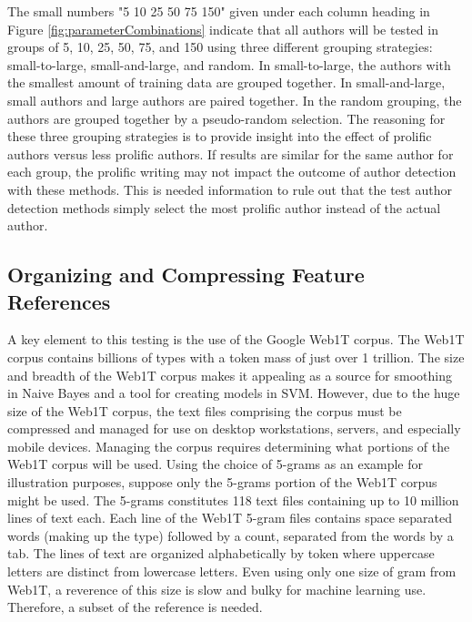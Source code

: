 The small numbers "5 10 25 50 75 150" given under each column heading in Figure \ref{fig:parameterCombinations} indicate that all authors will be tested in groups of 5, 10, 25, 50, 75, and 150 using three different grouping strategies: small-to-large, small-and-large, and random. In small-to-large, the authors with the smallest amount of training data are grouped together.  In small-and-large, small authors and large authors are paired together.  In the random grouping, the authors are grouped together by a pseudo-random selection.  The reasoning for these three grouping strategies is to provide insight into the effect of prolific authors versus less prolific authors.  If results are similar for the same author for each group, the prolific writing may not impact the outcome of author detection with these methods.  This is needed information to rule out that the test author detection methods simply select the most prolific author instead of the actual author.

	\subsection{Organizing and Compressing Feature References} A key element to this testing is the use of the Google Web1T corpus.  The Web1T corpus contains billions of types with a token mass of just over 1 trillion.  The size and breadth of the Web1T corpus makes it appealing as a source for smoothing in Naive Bayes and a tool for creating models in SVM. However, due to the huge size of the Web1T corpus, the text files comprising the corpus must be compressed and managed for use on desktop workstations, servers, and especially mobile devices.  Managing the corpus requires determining what portions of the Web1T corpus will be used.  Using the choice of 5-grams as an example for illustration purposes, suppose only the 5-grams portion of the Web1T corpus might be used.  The 5-grams constitutes 118 text files containing up to 10 million lines of text each. Each line of the Web1T 5-gram files contains space separated words (making up the type) followed by a count, separated from the words by a tab.  The lines of text are organized alphabetically by token where uppercase letters are distinct from lowercase letters. Even using only one size of gram from Web1T, a reverence of this size is slow and bulky for machine learning use.  Therefore, a subset of the reference is needed.
